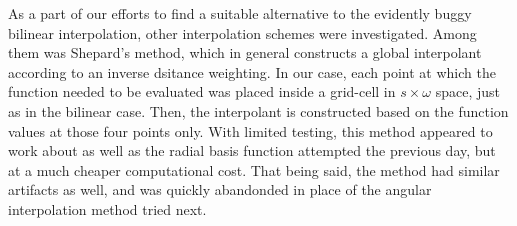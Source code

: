 
As a part of our efforts to find a suitable alternative to the evidently buggy bilinear interpolation, other interpolation schemes were investigated.
Among them was Shepard's method, which in general constructs a global interpolant according to an inverse dsitance weighting.
In our case, each point at which the function needed to be evaluated was placed inside a grid-cell in $s \times \omega$ space, just as in the bilinear case.
Then, the interpolant is constructed based on the function values at those four points only. 
With limited testing, this method appeared to work about as well as the radial basis function attempted the previous day, but at a much cheaper computational cost.
That being said, the method had similar artifacts as well, and was quickly abandonded in place of the angular interpolation method tried next.